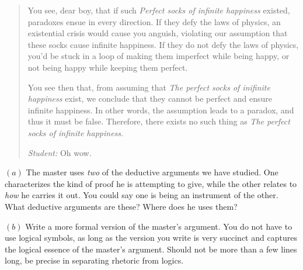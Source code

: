 \documentclass[a4paper, 12pt]{article}
\begin{document}
\begin{quote}
You see, dear boy, that if such \textit{Perfect socks of infinite happiness}
existed, paradoxes ensue in every direction. If they defy the laws of physics,
an existential crisis would cause you anguish, violating our assumption that
these socks cause infinite happiness. If they do not defy the laws of physics,
you'd be stuck in a loop of making them imperfect while being happy, or not
being happy while keeping them perfect. 

You see then that, from assuming that \textit{The perfect socks of inifinite
happiness} exist, we conclude that they cannot be perfect and ensure infinite
happiness. In other words, the assumption leads to a paradox, and thus it
must be false. Therefore, there exists no such thing as \textit{The perfect socks of 
infinite happiness}. 

\textit{Student:} Oh wow.

\end{quote}

$(a)$ The master uses \textit{two} of the deductive arguments we have studied.
One characterizes the kind of proof he is attempting to give, while the other
relates to \textit{how} he carries it out. You could say one is being an instrument 
of the other. What deductive arguments are these? Where does he uses them?

$(b)$ Write a more formal version of the master's argument. You do not have to
use logical symbols, as long as the version you write is very succinct and
captures the logical essence of the master's argument. Should not be more than 
a few lines long, be precise in separating rhetoric from logics.
\end{document}
